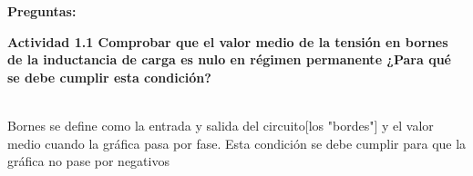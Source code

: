 \documentclass[letterpaper]{article}
\begin{document}
    \begin{LARGE}
     \textbf{Preguntas:}
     \end{LARGE}
 
 
 
 
 
 
 \begin{large}

\textbf{Actividad 1.1 Comprobar que el valor medio de la tensión en bornes
de la inductancia de carga es nulo en régimen permanente ¿Para qué
se debe cumplir esta condición?} \end{large}\\

    Bornes se define como la entrada y salida del circuito[los "bordes"] y el valor medio cuando la gráfica pasa por fase. Esta condición se debe cumplir para que la gráfica no pase por negativos
\end{document}
